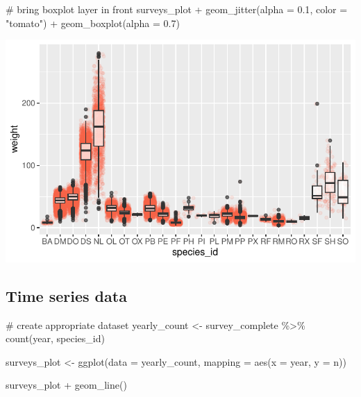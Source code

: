 \documentclass[
  letterpaper,
  DIV=11,
  numbers=noendperiod]{scrreprt}
\newenvironment{Shaded}{\begin{snugshade}}{\end{snugshade}}
\newcommand{\AttributeTok}[1]{\textcolor[rgb]{0.40,0.45,0.13}{#1}}
\newcommand{\CommentTok}[1]{\textcolor[rgb]{0.37,0.37,0.37}{#1}}
\newcommand{\FloatTok}[1]{\textcolor[rgb]{0.68,0.00,0.00}{#1}}
\newcommand{\FunctionTok}[1]{\textcolor[rgb]{0.28,0.35,0.67}{#1}}
\newcommand{\NormalTok}[1]{\textcolor[rgb]{0.00,0.23,0.31}{#1}}
\newcommand{\OtherTok}[1]{\textcolor[rgb]{0.00,0.23,0.31}{#1}}
\newcommand{\SpecialCharTok}[1]{\textcolor[rgb]{0.37,0.37,0.37}{#1}}
\newcommand{\StringTok}[1]{\textcolor[rgb]{0.13,0.47,0.30}{#1}}
\begin{document}
\begin{Shaded}
\begin{Highlighting}[]
\CommentTok{\# bring boxplot layer in front}
\NormalTok{surveys\_plot }\SpecialCharTok{+} \FunctionTok{geom\_jitter}\NormalTok{(}\AttributeTok{alpha =} \FloatTok{0.1}\NormalTok{, }\AttributeTok{color =} \StringTok{"tomato"}\NormalTok{) }\SpecialCharTok{+}
    \FunctionTok{geom\_boxplot}\NormalTok{(}\AttributeTok{alpha =} \FloatTok{0.7}\NormalTok{)}
\end{Highlighting}
\end{Shaded}

\includegraphics{src/notebooks/r_files/figure-pdf/unnamed-chunk-44-3.pdf}

\subsection{Time series data}\label{time-series-data}

\begin{Shaded}
\begin{Highlighting}[]
\CommentTok{\# create appropriate dataset}
\NormalTok{yearly\_count }\OtherTok{\textless{}{-}}\NormalTok{ survey\_complete }\SpecialCharTok{\%\textgreater{}\%}
    \FunctionTok{count}\NormalTok{(year, species\_id)}

\NormalTok{surveys\_plot }\OtherTok{\textless{}{-}} \FunctionTok{ggplot}\NormalTok{(}\AttributeTok{data =}\NormalTok{ yearly\_count, }
    \AttributeTok{mapping =} \FunctionTok{aes}\NormalTok{(}\AttributeTok{x =}\NormalTok{ year, }\AttributeTok{y =}\NormalTok{ n))}

\NormalTok{surveys\_plot }\SpecialCharTok{+} \FunctionTok{geom\_line}\NormalTok{()}
\end{Highlighting}
\end{Shaded}
\end{document}

